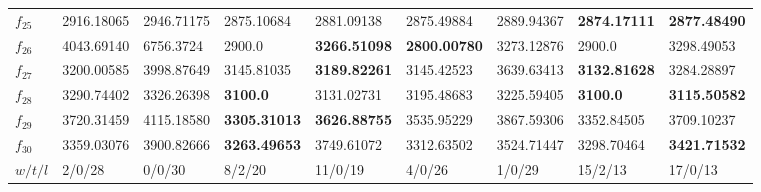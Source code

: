 \begin{table*}[t!]
\begin{tabular}{|p{0.8cm}|p{1.6cm}|p{1.6cm}|p{1.6cm}|p{1.6cm}|p{1.6cm}|p{1.6cm}|p{1.6cm}|p{1.6cm}|}
$f_{25}$  & 2916.18065 & 2946.71175 & 2875.10684 & 2881.09138 & 2875.49884 & 2889.94367 & \textbf{2874.17111} & \textbf{2877.48490} \\ 
$f_{26}$  & 4043.69140 & 6756.3724 & 2900.0 & \textbf{3266.51098} & \textbf{2800.00780} & 3273.12876 & 2900.0 & 3298.49053 \\ 
$f_{27}$  & 3200.00585 & 3998.87649 & 3145.81035 & \textbf{3189.82261} & 3145.42523 & 3639.63413 & \textbf{3132.81628} & 3284.28897 \\ 
$f_{28}$  & 3290.74402 & 3326.26398 & \textbf{3100.0} & 3131.02731 & 3195.48683 & 3225.59405 & \textbf{3100.0} & \textbf{3115.50582} \\ 
$f_{29}$  & 3720.31459 & 4115.18580 & \textbf{3305.31013} & \textbf{3626.88755} & 3535.95229 & 3867.59306 & 3352.84505 & 3709.10237 \\ 
$f_{30}$  & 3359.03076 & 3900.82666 & \textbf{3263.49653} & 3749.61072 & 3312.63502 & 3524.71447 & 3298.70464 & \textbf{3421.71532} \\ 
\hline
$w/t/l$  & 2/0/28 & 0/0/30 & 8/2/20 & 11/0/19 & 4/0/26 & 1/0/29 & 15/2/13 & 17/0/13 \\
\hline
\end{tabular}
\end{table*}
